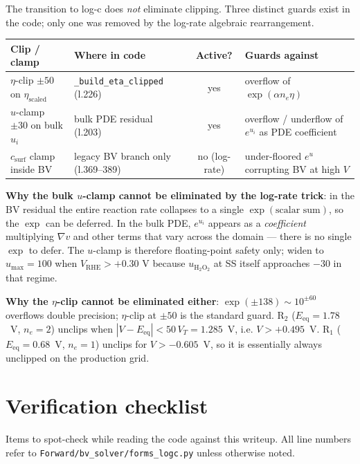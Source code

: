 \documentclass[11pt]{article}
\newcommand{\Eeq}{E_{\mathrm{eq}}}
\begin{document}
The transition to log-c does \emph{not} eliminate clipping. Three distinct
guards exist in the code; only one was removed by the log-rate algebraic
rearrangement.

\begin{center}
\renewcommand{\arraystretch}{1.4}
\small
\begin{tabular}{@{} p{} p{} c p{} @{}}
\toprule
\textbf{Clip / clamp} & \textbf{Where in code} & \textbf{Active?} & \textbf{Guards against} \\
\midrule
$\eta$-clip $\pm 50$ on $\eta_{\mathrm{scaled}}$ &
\verb|_build_eta_clipped| (l.226) & yes &
overflow of $\exp(\alpha n_e\eta)$ \\
$u$-clamp $\pm 30$ on bulk $u_i$ &
bulk PDE residual (l.203) & yes &
overflow / underflow of $e^{u_i}$ as PDE coefficient \\
$c_{\mathrm{surf}}$ clamp inside BV &
legacy BV branch only (l.369--389) & no (log-rate) &
under-floored $e^{u}$ corrupting BV at high $V$ \\
\bottomrule
\end{tabular}
\end{center}

\noindent
\textbf{Why the bulk $u$-clamp cannot be eliminated by the log-rate trick}:
in the BV residual the entire reaction rate collapses to a single
$\exp(\text{scalar sum})$, so the $\exp$ can be deferred. In the bulk PDE,
$e^{u_i}$ appears as a \emph{coefficient} multiplying $\nabla v$ and other
terms that vary across the domain --- there is no single $\exp$ to defer.
The $u$-clamp is therefore floating-point safety only; widen to $u_{\max}=100$
when $V_{\mathrm{RHE}} > +0.30$ V because $u_{\mathrm{H_2O_2}}$ at SS
itself approaches $-30$ in that regime.

\noindent
\textbf{Why the $\eta$-clip cannot be eliminated either}:
$\exp(\pm 138)\sim 10^{\pm 60}$ overflows double precision; $\eta$-clip at
$\pm 50$ is the standard guard. R$_2$ ($\Eeq = 1.78$~V, $n_e = 2$) unclips
when $|V - \Eeq| < 50\,V_T = 1.285$~V, i.e. $V > +0.495$~V. R$_1$
($\Eeq = 0.68$~V, $n_e = 1$) unclips for $V > -0.605$~V, so it is
essentially always unclipped on the production grid.

\section{Verification checklist}
Items to spot-check while reading the code against this writeup. All line
numbers refer to \texttt{Forward/bv\_solver/forms\_logc.py} unless otherwise
noted.
\end{document}
